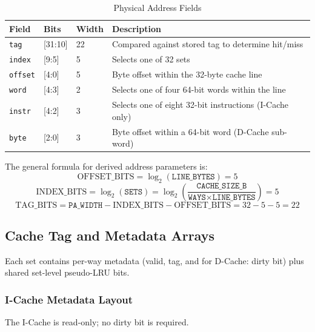 \begin{table}[H]
\caption{Physical Address Fields}
\label{tab:asAddrFields}
\centering
\begin{tabularx}{\textwidth}{|l |l |l |X|}
  \hline
  Field & Bits & Width & Description \\
  \hline
  \hline
  \texttt{tag}    & [31:10] & 22 & Compared against stored tag to determine hit/miss \\
  \hline
  \texttt{index}  & [9:5]   & 5  & Selects one of 32 sets \\
  \hline
  \texttt{offset} & [4:0]   & 5  & Byte offset within the 32-byte cache line \\
  \hline
  \texttt{word}   & [4:3]   & 2  & Selects one of four 64-bit words within the line \\
  \hline
  \texttt{instr}  & [4:2]   & 3  & Selects one of eight 32-bit instructions (I-Cache only) \\
  \hline
  \texttt{byte}   & [2:0]   & 3  & Byte offset within a 64-bit word (D-Cache sub-word) \\
  \hline
\end{tabularx}
\end{table}

The general formula for derived address parameters is:
\[
  \text{OFFSET\_BITS} = \log_2(\texttt{LINE\_BYTES}) = 5
\]
\[
  \text{INDEX\_BITS}  = \log_2(\texttt{SETS}) = \log_2\!\left(\frac{\texttt{CACHE\_SIZE\_B}}{\texttt{WAYS} \times \texttt{LINE\_BYTES}}\right) = 5
\]
\[
  \text{TAG\_BITS} = \texttt{PA\_WIDTH} - \text{INDEX\_BITS} - \text{OFFSET\_BITS} = 32 - 5 - 5 = 22
\]

\subsection{Cache Tag and Metadata Arrays}

Each set contains per-way metadata (valid, tag, and for D-Cache: dirty bit)
plus shared set-level pseudo-LRU bits.

\subsubsection{I-Cache Metadata Layout}

The I-Cache is read-only; no dirty bit is required.

